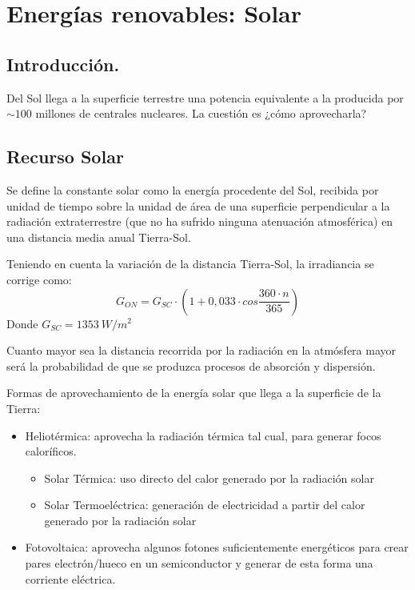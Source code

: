 \chapter{Energías renovables: Solar}
\section{Introducción.}
Del Sol llega a la superficie terrestre una potencia equivalente a la producida por $\sim 100$ millones de centrales nucleares. La cuestión es ¿cómo aprovecharla?

\section{Recurso Solar}
Se define la constante solar como la energía procedente del Sol, recibida por unidad de tiempo sobre la unidad de área de una superficie perpendicular a la radiación extraterrestre (que no ha sufrido ninguna atenuación atmosférica) en una distancia media anual Tierra-Sol.

Teniendo en cuenta la variación de la distancia Tierra-Sol, la irradiancia se corrige como:
\begin{equation}
    G_{ON} = G_{SC} \cdot (1 + 0,033 \cdot cos \frac{360 \cdot n}{365})
\end{equation}
Donde $G_ {SC} = 1353\ W/m^2$

Cuanto mayor sea la distancia recorrida por la radiación en la atmósfera mayor será la probabilidad de que se produzca procesos de absorción y dispersión.

Formas de aprovechamiento de la energía solar que llega a la superficie de la Tierra:
\begin{itemize}
    \item Heliotérmica: aprovecha la radiación térmica tal cual, para generar focos caloríficos.
    \begin{itemize}
        \item Solar Térmica: uso directo del calor generado por la radiación solar
        \item Solar Termoeléctrica: generación de electricidad a partir del calor generado por la radiación solar
    \end{itemize}
    \item Fotovoltaica: aprovecha algunos fotones suficientemente energéticos para crear pares electrón/hueco en un semiconductor y generar de esta forma una corriente eléctrica.
\end{itemize}

